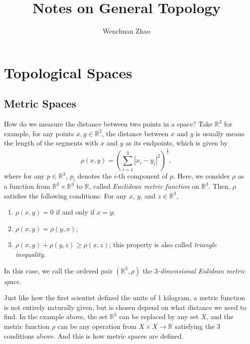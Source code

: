 \documentclass{report}
\title{Notes on General Topology}
\author{Wenchuan Zhao}
\begin{document}
\maketitle
\tableofcontents




\chapter{Topological Spaces}


\section{Metric Spaces}


How do we measure the distance between two points in a space? Take $\mathbb R^3$ for example, for any points $x, y \in \mathbb R^3$, the distance between $x$ and $y$ is usually means the length of the segments with $x$ and $y$ as its endpoints, which is given by
$$
\rho(x, y) = \left( \sum_{i = 1}^3 |x_i - y_i|^2 \right)^\frac{1}{2},
$$
where for any $p \in \mathbb R^3$, $p_i$ denotes the $i$-th component of $p$. Here, we consider $\rho$ as a function from $\mathbb R^3 \times \mathbb R^3$ to $\mathbb R$, called \textit{Euclidean metric function} on $\mathbb R^3$. Then, $\rho$ satisfies the following conditions: For any $x$, $y$, and $z \in \mathbb R^3$,
\begin{enumerate}
	\item $\rho(x, y) = 0$ if and only if $x = y$;
	\item $\rho(x, y) = \rho(y, x)$;
	\item $\rho(x, y) + \rho(y, z) \ge \rho(x, z)$; this property is also called \textit{triangle inequality}.
\end{enumerate}

In this case, we call the ordered pair $(\mathbb R^3, \rho)$ the \textit{$3$-dimensional Eulidean metric space}.

Just like how the first scientist defined the unite of 1 kilogram, a metric function is not entirely naturally given, but is chosen depend on what distance we need to find. In the example above, the set $\mathbb R^3$ can be replaced by any set $X$, and the metric function $\rho$ can be any operation from $X \times X \to \mathbb R$ satisfying the 3 conditions above. And this is how metric spaces are defined.
\end{document}
